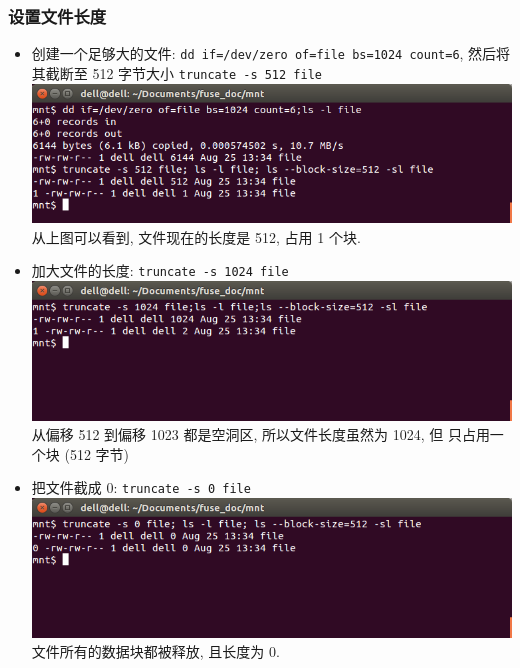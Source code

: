 \documentclass[nofonts, titlepage]{ctexart}
\begin{document}
\subsubsection{设置文件长度}
\begin{itemize}
    \item 创建一个足够大的文件: \texttt{dd if=/dev/zero of=file bs=1024 
        count=6}, 然后将其截断至 512 字节大小 \texttt{truncate -s 512 
        file} \\
        \includegraphics[width=14cm]{./images/truncate_t1.png} \\
        从上图可以看到, 文件现在的长度是 512, 占用 1 个块.
    \item 加大文件的长度: \texttt{truncate -s 1024 file} \\
        \includegraphics[width=14cm]{./images/truncate_t2.png} \\
        从偏移 512 到偏移 1023 都是空洞区, 所以文件长度虽然为 1024, 但
        只占用一个块 (512 字节)
    \item 把文件截成 0: \texttt{truncate -s 0 file} \\
        \includegraphics[width=14cm]{./images/truncate_t3.png} \\
        文件所有的数据块都被释放, 且长度为 0.
\end{itemize}
\end{document}
